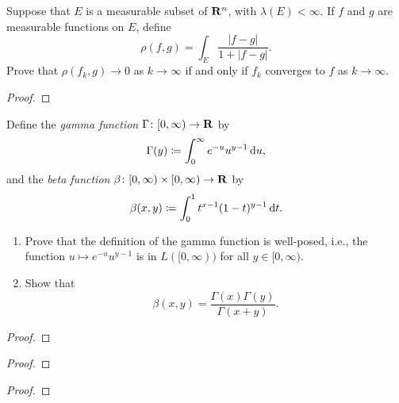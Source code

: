 \begin{problem}
Suppose that $E$ is a measurable subset of $\mathbf{R}^n$, with
$\lambda(E)<\infty$. If $f$ and $g$ are measurable functions on $E$, define
\[
\rho(f,g)=\int_E\frac{|f-g|}{1+|f-g|}.
\]
Prove that $\rho(f_k,g)\to 0$ as $k\to\infty$ if and only if $f_k$
converges to $f$ as $k\to\infty$.
\end{problem}
\begin{proof}
\end{proof}

\begin{problem}
Define the \emph{gamma function} $\Gamma\colon[0,\infty)\to\mathbf{R}$ by
\[
\Gamma(y)\coloneqq\int_0^\infty e^{-u}u^{y-1}\mathop{}\!\mathrm{d} u,
\]
and the \emph{beta function} $\beta\colon[0,\infty)\times[0,\infty)\to\mathbf{R}$
by
\[
\beta(x,y)\coloneqq\int_0^1 t^{x-1}(1-t)^{y-1}\mathop{}\!\mathrm{d} t.
\]
\begin{enumerate}[label=(\alph*)]
\item Prove that the definition of the gamma function is well-posed, i.e.,
  the function $u\mapsto e^{-u}u^{y-1}$ is in $L([0,\infty))$ for all
  $y\in[0,\infty)$.
\item Show that
\[
\beta(x,y)=\frac{\Gamma(x)\Gamma(y)}{\Gamma(x+y)}.
\]
\end{enumerate}
\end{problem}
\begin{proof}
\end{proof}

\begin{problem}
\end{problem}
\begin{proof}
\end{proof}

\begin{problem}
\end{problem}
\begin{proof}
\end{proof}

